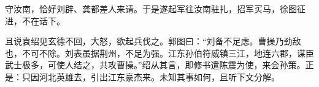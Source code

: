 守汝南，恰好刘辟、龚都差人来请。于是遂起军往汝南驻扎，招军买马，徐图征进，不在话下。

且说袁绍见玄德不回，大怒，欲起兵伐之。郭图曰：“刘备不足虑。曹操乃劲敌也，不可不除。刘表虽据荆州，不足为强。江东孙伯符威镇三江，地连六郡，谋臣武士极多，可使人结之，共攻曹操。”绍从其言，即修书遣陈震为使，来会孙策。正是：只因河北英雄去，引出江东豪杰来。未知其事如何，且听下文分解。